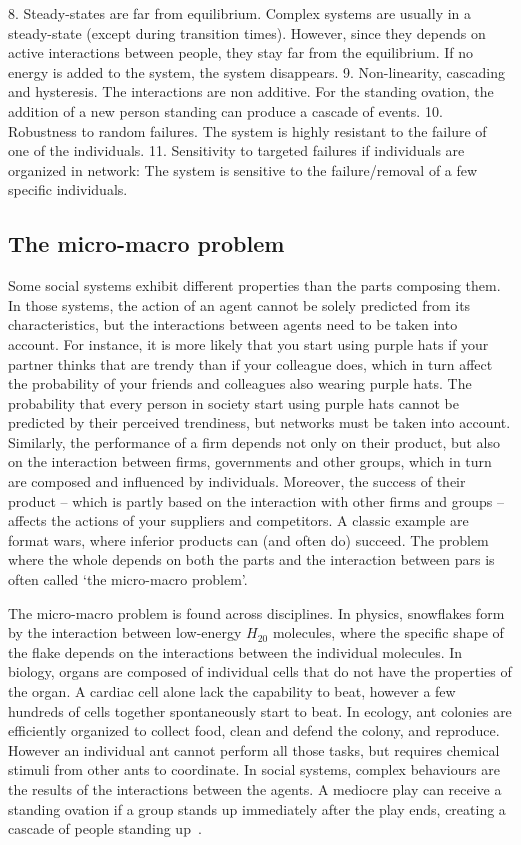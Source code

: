 8. Steady-states are far from equilibrium. Complex systems are usually in a steady-state (except during transition times). However, since they depends on active interactions between people, they stay far from the equilibrium. If no energy is added to the system, the system disappears.
9. Non-linearity, cascading and hysteresis. The interactions are non additive. For the standing ovation, the addition of a new person standing can produce a cascade of events.
10. Robustness to random failures. The system is highly resistant to the failure of one of the individuals. 
11. Sensitivity to targeted failures if individuals are organized in network: The system is sensitive to the failure/removal of a few specific individuals. 

\subsection{The micro-macro problem}
Some social systems exhibit different properties than the parts composing them.
In those systems, the action of an agent cannot be solely predicted from its characteristics, 
but the interactions between agents need to be taken into account. 
For instance, it is more likely that you start using purple hats if your partner thinks that are trendy than if your colleague does,
which in turn affect the probability of your friends and colleagues also wearing purple hats.
The probability that every person in society start using purple hats cannot be predicted by their perceived trendiness, 
but networks must be taken into account.
Similarly, the performance of a firm depends not only on their product,
but also on the interaction between firms, governments and other groups, 
which in turn are composed and influenced by individuals.
Moreover, the success of their product 
-- which is partly based on the interaction with other firms and groups -- 
affects the actions of your suppliers and competitors.
A classic example are format wars,
where inferior products can (and often do) succeed.
The problem where the whole depends on both the parts and the interaction between pars is often called `the micro-macro problem'.

The micro-macro problem is found across disciplines. 
In physics, snowflakes form by the interaction between low-energy $H_20$ molecules, 
where the specific shape of the flake depends on the interactions between the individual molecules.
In biology, organs are composed of individual cells that do not have the properties of the organ. 
A cardiac cell alone lack the capability to beat, however a few hundreds of cells together spontaneously start to beat.
In ecology, ant colonies are efficiently organized to collect food, clean and defend the colony, and reproduce. 
However an individual ant cannot perform all those tasks, 
but requires chemical stimuli from other ants to coordinate.
In social systems, complex behaviours are the results of the interactions between the agents. 
A mediocre play can receive a standing ovation if a group stands up immediately after the play ends, 
creating a cascade of people standing up~\citep{miller2004}. 

